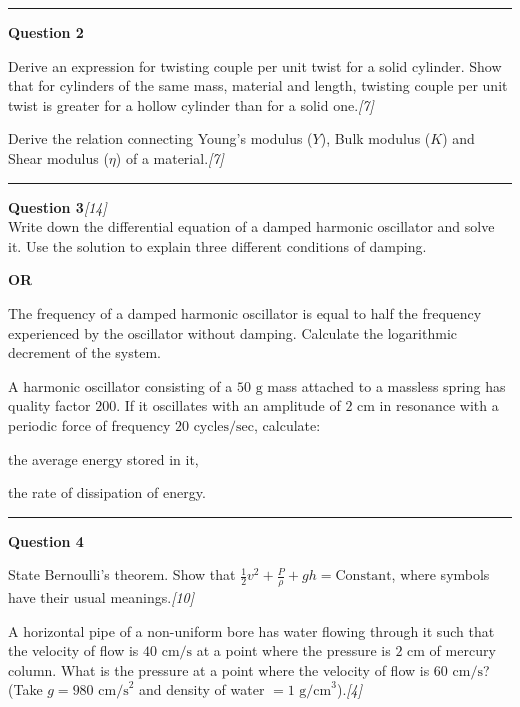 \documentclass[11pt,a4paper]{article}
\newcommand{\pts}[1]{\hfill   \textit{[#1]}}
\begin{document}
\medskip\rule{\linewidth}{0.2pt}\medskip




\noindent   \textbf{Question 2}

\begin{parts}
  \item Derive an expression for twisting couple per unit twist for a solid cylinder. Show that for cylinders of the same mass, material and length, twisting couple per unit twist is greater for a hollow cylinder than for a solid one.\pts{7}
  \item Derive the relation connecting Young's modulus ($Y$), Bulk modulus ($K$) and Shear modulus ($\eta$) of a material.\pts{7}
\end{parts}

\medskip\rule{\linewidth}{0.2pt}\medskip




\noindent   \textbf{Question 3}\pts{14} \\
Write down the differential equation of a damped harmonic oscillator and solve it. Use the solution to explain three different conditions of damping.


\begin{center}   \textbf{OR}\end{center}


\begin{parts}
  \item The frequency of a damped harmonic oscillator is equal to half the frequency experienced by the oscillator without damping. Calculate the logarithmic decrement of the system.
  \item A harmonic oscillator consisting of a $50 \text{ g}$ mass attached to a massless spring has quality factor $200$. If it oscillates with an amplitude of $2 \text{ cm}$ in resonance with a periodic force of frequency $20 \text{ cycles/sec}$, calculate:
  
\begin{parts}[label=(\alph*)]
    \item the average energy stored in it,
    \item the rate of dissipation of energy.
  \end{parts}
\end{parts}

\medskip\rule{\linewidth}{0.2pt}\medskip




\noindent   \textbf{Question 4}

\begin{parts}
  \item State Bernoulli's theorem. Show that $\frac{1}{2}v^2 + \frac{P}{\rho} + gh =  \text{Constant}$, where symbols have their usual meanings.\pts{10}
  \item A horizontal pipe of a non-uniform bore has water flowing through it such that the velocity of flow is $40 \text{ cm/s}$ at a point where the pressure is $2 \text{ cm}$ of mercury column. What is the pressure at a point where the velocity of flow is $60 \text{ cm/s}$? (Take $g = 980 \text{ cm/s}^2$ and density of water $= 1 \text{ g/cm}^3$).\pts{4}
\end{parts}
\end{document}
